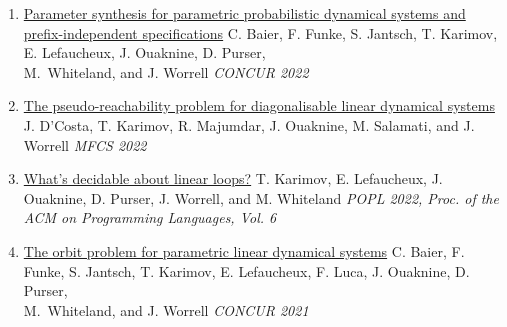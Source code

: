 \documentclass{article}
\begin{document}
\begin{enumerate}
		\item 
            \href{https://drops.dagstuhl.de/opus/volltexte/2022/17073/}{\large Parameter synthesis for parametric probabilistic dynamical systems and \\[0.2cm] prefix-independent specifications}
            \vspace{0.2cm}\newline
            C. Baier, F. Funke, S. Jantsch, T. Karimov, E. Lefaucheux, J. Ouaknine, D. Purser, \\[0.14cm] M.~Whiteland, and J. Worrell
		\vspace*{0.25cm}\newline\emph{CONCUR 2022}
		\vspace*{0.2cm}
            
		\item 
            \href{https://drops.dagstuhl.de/opus/volltexte/2022/16838/}{\large The pseudo-reachability problem for diagonalisable linear dynamical systems}
            \vspace{0.2cm}\newline
            J. D'Costa, T. Karimov, R. Majumdar, J. Ouaknine, M. Salamati, and J. Worrell
		\vspace*{0.25cm}\newline\emph{MFCS 2022}
		\vspace*{0.2cm}
  
  		\newpage
		\item 
            \href{https://dl.acm.org/doi/10.2145/3498727}{\large What's decidable about linear loops?}
            \vspace{0.2cm}\newline
            T. Karimov, E. Lefaucheux, J. Ouaknine, D. Purser, J. Worrell, and M. Whiteland
		\vspace*{0.25cm}\newline\emph{POPL 2022, Proc. of the ACM on Programming Languages, Vol. 6}
            \vspace*{0.2cm}
		
		\item 
            \href{https://drops.dagstuhl.de/entities/document/10.4230/LIPIcs.CONCUR.2021.28}{\large The orbit problem for parametric linear dynamical systems}
            \vspace{0.2cm}\newline
            C. Baier, F. Funke, S. Jantsch, T. Karimov, E. Lefaucheux, F. Luca, J. Ouaknine, D. Purser, \\[0.14cm] M.~Whiteland, and J. Worrell
		\vspace*{0.25cm}\newline \emph{CONCUR 2021}
            \vspace*{0.2cm}
		

\end{enumerate}
\end{document}
